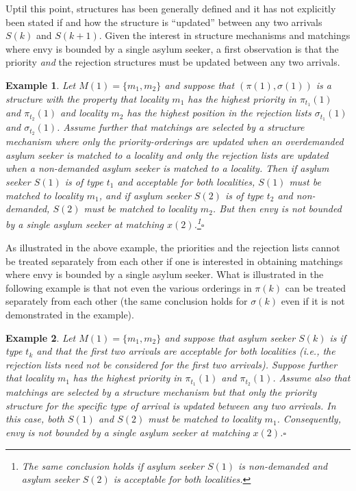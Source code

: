 \documentclass[12pt,fleqn]{article}
\newtheorem{example}{Example}
\begin{document}
\noindent Uptil this point, structures has been generally defined and it has not explicitly been stated if and how the structure is ``updated'' between any two arrivals $S(k)$ and $S(k+1)$. Given the interest in structure mechanisms and matchings where envy is bounded by a single asylum seeker, a first observation is that the priority \emph{and} the rejection structures must be updated between any two arrivals.
\begin{example}\rm
Let $M(1)=\{m_1,m_2\}$ and suppose that $(\pi(1),\sigma(1))$ is a structure with the property that locality $m_1$ has the highest priority in $\pi_{t_1}(1)$ and $\pi_{t_2}(1)$ and locality $m_2$ has the highest position in the rejection lists $\sigma_{t_1}(1)$ and $\sigma_{t_2}(1)$. Assume further that matchings are selected by a structure mechanism where \emph{only} the priority-orderings are updated when an overdemanded asylum seeker is matched to a locality and \emph{only} the rejection lists are updated when a non-demanded asylum seeker is matched to a locality. Then if asylum seeker $S(1)$ is of type $t_1$ and acceptable for both localities, $S(1)$ must be matched to locality $m_1$, and if asylum seeker $S(2)$ is of type $t_2$ and non-demanded, $S(2)$ must be matched to locality $m_2$. But then envy is not bounded by a single asylum seeker at matching $x(2)$.\footnote{The same conclusion holds if asylum seeker $S(1)$ is non-demanded and asylum seeker $S(2)$ is acceptable for both localities.}\hfill$\square$
\end{example}

\noindent As illustrated in the above example, the priorities and the rejection lists cannot be treated separately from each other if one is interested in obtaining matchings where envy is bounded by a single asylum seeker. What is illustrated in the following example is that not even the various orderings in $\pi(k)$ can be treated separately from each other (the same conclusion holds for $\sigma(k)$ even if it is not demonstrated in the example).

\begin{example}\rm
Let $M(1)=\{m_1,m_2\}$ and suppose that asylum seeker $S(k)$ is if type $t_k$ and that the first two arrivals are acceptable for both localities (i.e., the rejection lists need not be considered for the first two arrivals). Suppose further that locality $m_1$ has the highest priority in $\pi_{t_1}(1)$ and $\pi_{t_2}(1)$. Assume also that matchings are selected by a structure mechanism but that \emph{only} the priority structure for the specific type of arrival is updated between any two arrivals. In this case, both $S(1)$ and $S(2)$ must be matched to locality $m_1$. Consequently, envy is not bounded by a single asylum seeker at matching $x(2)$.\hfill $\square$
\end{example}
\end{document}
